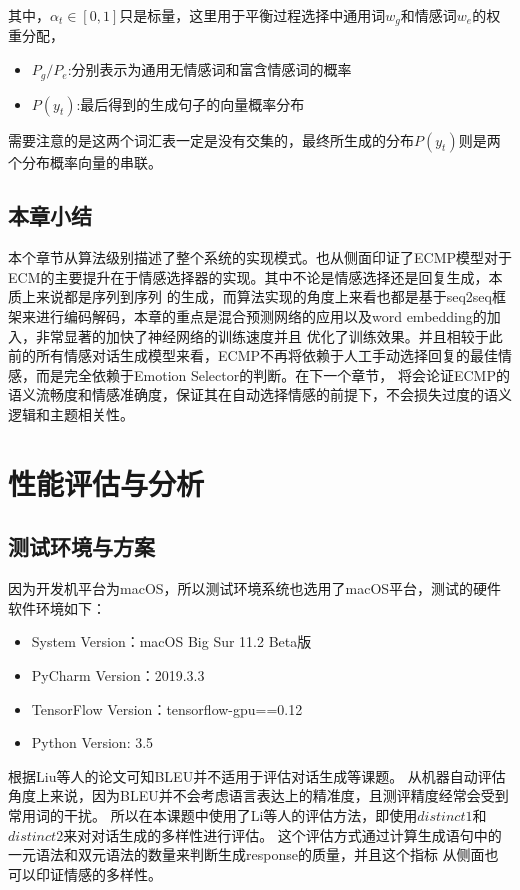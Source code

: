 \documentclass[supercite]{HustGraduPaper}
\theoremstyle{definition}
\begin{document}
其中，$\alpha_t \in [0,1]$只是标量，这里用于平衡过程选择中通用词$w_g$和情感词$w_e$的权重分配，
\begin{itemize}
  \item $P_g/P_e$:分别表示为通用无情感词和富含情感词的概率
  \item $P(y_t)$:最后得到的生成句子的向量概率分布
\end{itemize}
需要注意的是这两个词汇表一定是没有交集的，最终所生成的分布$P(y_t)$则是两个分布概率向量的串联。

\subsection{本章小结}
本个章节从算法级别描述了整个系统的实现模式。也从侧面印证了ECMP模型对于ECM的主要提升在于情感选择器的实现。其中不论是情感选择还是回复生成，本质上来说都是序列到序列
的生成，而算法实现的角度上来看也都是基于seq2seq框架来进行编码解码，本章的重点是混合预测网络的应用以及word embedding的加入，非常显著的加快了神经网络的训练速度并且
优化了训练效果。并且相较于此前的所有情感对话生成模型来看，ECMP不再将依赖于人工手动选择回复的最佳情感，而是完全依赖于Emotion Selector的判断。在下一个章节，
将会论证ECMP的语义流畅度和情感准确度，保证其在自动选择情感的前提下，不会损失过度的语义逻辑和主题相关性。

\section{性能评估与分析}
\subsection{测试环境与方案}
因为开发机平台为macOS，所以测试环境系统也选用了macOS平台，测试的硬件软件环境如下：
\begin{itemize}
  \item System Version：macOS Big Sur 11.2 Beta版
  \item PyCharm Version：2019.3.3
  \item TensorFlow Version：tensorflow-gpu==0.12
  \item Python Version: 3.5
\end{itemize}

根据Liu\cite{liu-etal-2016-evaluate}等人的论文可知BLEU并不适用于评估对话生成等课题。
从机器自动评估角度上来说，因为BLEU并不会考虑语言表达上的精准度，且测评精度经常会受到常用词的干扰。
所以在本课题中使用了Li\cite{li2015diversity}等人的评估方法，即使用$distinct 1$和$distinct 2$来对对话生成的多样性进行评估。
这个评估方式通过计算生成语句中的一元语法和双元语法的数量来判断生成response的质量，并且这个指标
从侧面也可以印证情感的多样性。
\end{document}
